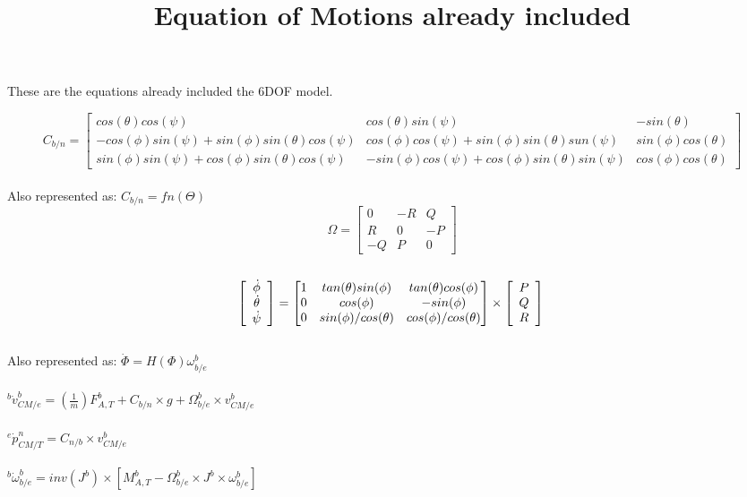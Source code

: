 \documentclass{article}
\title{Equation of Motions already included}
\begin{document}
\maketitle

These are the equations already included the 6DOF model.

\[
C_{b/n}=
  \begin{bmatrix}
    cos(\theta)cos(\psi) & cos(\theta)sin(\psi) & -sin(\theta) \\
    -cos(\phi)sin(\psi) + sin(\phi)sin(\theta)cos(\psi) & cos(\phi)cos(\psi) + sin(\phi)sin(\theta)sun(\psi) & sin(\phi)cos(\theta) \\
    sin(\phi)sin(\psi) + cos(\phi)sin(\theta)cos(\psi) & -sin(\phi)cos(\psi) + cos(\phi)sin(\theta)sin(\psi) & cos(\phi)cos(\theta)
  \end{bmatrix}
\]\\
Also represented as: $C_{b/n} = fn(\Theta)$
\\
\[
\Omega=
  \begin{bmatrix}
    0 & -R & Q \\
    R & 0 & -P\\
    -Q & P & 0
  \end{bmatrix}
\]
\\
\[
\left[ \begin{array}{c} 
   \dot{\phi}
\\ \dot{\theta}
\\ \dot{\psi}
 \end{array} \right] = \begin{bmatrix} 1 & tan(\theta)sin(\phi) & tan(\theta)cos(\phi) \\ 0 & cos(\phi) & -sin(\phi)\\
0 &  sin(\phi)/cos(\theta) & cos(\phi)/cos(\theta)
  \end{bmatrix} \times \left[ \begin{array}{c} P\\Q \\ R \end{array} \right]
\\
\]
\\ Also represented as: $\dot{\Phi} = H(\Phi) \omega^b _{b/e}$
\\
\\
${}^b\dot{v}^b_{CM/e} =(\frac{1}{m})F^b_{A,T} + C_{b/n} \times g + \Omega^b _{b/e}\times v^b_{CM/e} $
\\ \\
${}^e \dot{p}^n_{CM/T} = C_{n/b} \times v^b_{CM/e} $
\\ \\
${}^b\dot{\omega}^b_{b/e} = inv(J^b) \times [M^b_{A,T}- \Omega^b_{b/e}\times J^b \times \omega^b_{b/e}]$
\\
\end{document}
